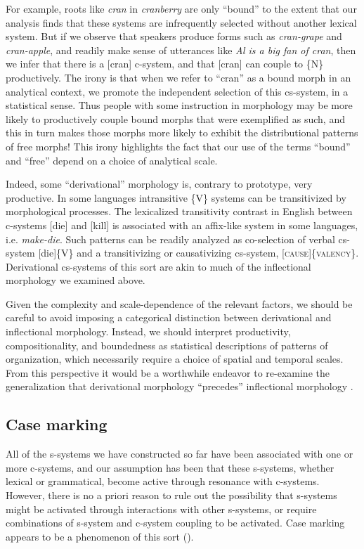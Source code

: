   For example, roots like \textit{cran} in \textit{cranberry} are only “bound” to the extent that our analysis finds that these systems are infrequently selected without another lexical system. But if we observe that speakers produce forms such as \textit{cran-grape} and \textit{cran-apple}, and readily make sense of utterances like \textit{Al is a big fan of cran}, then we infer that there is a [cran] c-system, and that [cran] can couple to \{N\} productively. The irony is that when we refer to “cran” as a bound morph in an analytical context, we promote the independent selection of this cs-system, in a statistical sense. Thus people with some instruction in morphology may be more likely to productively couple bound morphs that were exemplified as such, and this in turn makes those morphs more likely to exhibit the distributional patterns of free morphs! This irony highlights the fact that our use of the terms “bound” and “free” depend on a choice of analytical scale.

  Indeed, some “derivational” morphology is, contrary to prototype, very productive. In some languages intransitive \{V\} systems can be transitivized by morphological processes. The lexicalized transitivity contrast in English between c-systems [die] and [kill] is associated with an affix-like system in some languages, i.e. \textit{make-die}. Such patterns can be readily analyzed as co-selection of verbal cs-system [die]\{V\} and a transitivizing or causativizing cs-system, [\textsc{cause}]\{\textsc{valency}\}. Derivational cs-systems of this sort are akin to much of the inflectional morphology we examined above. 

  Given the complexity and scale-dependence of the relevant factors, we should be careful to avoid imposing a categorical distinction between derivational and inflectional morphology. Instead, we should interpret productivity, compositionality, and boundedness as statistical descriptions of patterns of organization, which necessarily require a choice of spatial and temporal scales. From this perspective it would be a worthwhile endeavor to re-examine the generalization that derivational morphology “precedes” inflectional morphology \citep{Booij1996}.

\subsection{Case marking}

All of the s-systems we have constructed so far have been associated with one or more c-systems, and our assumption has been that these s-systems, whether lexical or grammatical, become active through resonance with c-systems. However, there is no a priori reason to rule out the possibility that s-systems might be activated through interactions with other s-systems, or require combinations of s-system and c-system coupling to be activated. Case marking appears to be a phenomenon of this sort (\citealt{BobaljikWurmbrand2008,MalchukovSpencer2008}).

